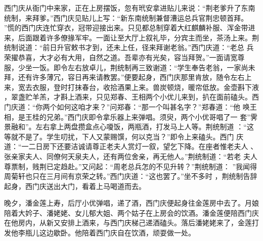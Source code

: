 西门庆从衙门中来家，正在上房摆饭，忽有玳安拿进贴儿来说：“荆老爹升了东南
统制，来拜爹。”西门庆见贴儿上写：“新东南统制兼督漕运总兵官荆忠顿首拜。
”慌的西门庆连忙穿衣，冠带迎接出来。只见都总制穿着大红麒麟补服、浑金带进
来，后面跟着许多僚掾军牢。一面让至大厅上叙礼毕，分宾主而坐，茶汤上来。荆
统制说道：“前日升官敕书才到，还未上任，径来拜谢老翁。”西门庆道：“老总
兵荣擢恭喜，大才必有大用，自然之道。吾辈亦有光矣，容当拜贺。”一面请宽尊
服，少坐一饭。即令左右放卓儿，荆统制再三致谢道：“学生奉告老翁，一家尚未
拜，还有许多薄冗，容日再来请教罢。”便要起身，西门庆那里肯放，随令左右上
来，宽去衣服，登时打抹春台，收拾酒果上来。兽炭顿烧，暖帘低放。金壶斟下液
，翠盏贮羊羔，才斟上酒来，只见郑春、王相两个小优儿来到，扒在面前磕头。西
门庆道：“你两个如何这咱才来？”问郑春：“那一个叫甚名字？”郑春道：“他
唤王相，是王桂的兄弟。”西门庆即令拿乐器上来弹唱。须臾，两个小优哥唱了一
套”霁景融和”。左右拿上两盘攒盒点心嗄饭，两瓶酒，打发马上人等。荆统制道
：“这等就不是了。学生叨扰，下人又蒙赐馔，何以克当？”即令上来磕头。西门
庆道：“一二日房下还要洁诚请尊正老夫人赏灯一叙，望乞下降。在座者惟老夫人
、张亲家夫人、同僚何天泉夫人，还有两位舍亲，再无他人。”荆统制道：“若老
夫人尊票制，贱荆已定趋赴。”又问起：“周老总兵怎的不见升转？”荆统制道：
”我闻得周菊轩也只在三月间有京荣之转。”西门庆道：“这也罢了。”坐不多时
，荆统制告辞起身，西门庆送出大门，看着上马喝道而去。

晚夕，潘金莲上寿，后厅小优弹唱，递了酒，西门庆便起身往金莲房中去了。月娘
陪着大妗子、潘姥姥、女儿郁大姐、两个姑子在上房会的饮酒。潘金莲便陪西门庆
在他房内，从新又安排上酒来，与西门庆梯己递酒磕头。落后潘姥姥来了，金莲打
发他李瓶儿这边歇卧。他陪着西门庆自在饮酒，顽耍做一处。

